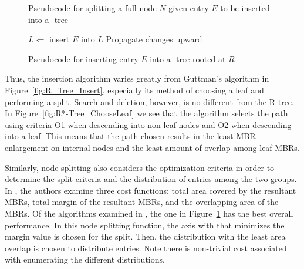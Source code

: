 \begin{figure}[ht!]
\begin{algorithmic}
		\EndFor
	\EndFunction
\end{algorithmic}
\caption{Pseudocode for splitting a full node $N$ given entry $E$ to be inserted into 
	a \rstar-tree}
\label{fig:R*-Tree_Split}
\end{figure}

\begin{figure}[ht!]
\begin{algorithmic}
		\State $L\Leftarrow$ 
			\State insert $E$ into $L$
		\Else
				\State {}
			\Else
				\State {}
			\EndIf
		\EndIf
		\State Propagate changes upward
	\EndFunction
\end{algorithmic}
\caption{Pseudocode for inserting entry $E$ into a \rstar-tree rooted at $R$}
\label{fig:R*-Tree_Insert}
\end{figure}

Thus, the insertion algorithm varies greatly from Guttman's algorithm in 
Figure~\ref{fig:R_Tree_Insert}, especially its method of choosing a leaf and performing a 
split. Search and deletion, however, is no different from the R-tree. In 
Figure~\ref{fig:R*-Tree_ChooseLeaf} we see that the algorithm selects the path using criteria
O1 when descending into non-leaf nodes and O2 when descending into a leaf. This means that
the path chosen results in the least MBR enlargement on internal nodes and the least 
amount of overlap among leaf MBRs. 

Similarly, node splitting also considers the optimization criteria in order to determine
the split criteria and the distribution of entries among the two groups. In 
\cite{beckmannkriegelschneiderseeger90}, the authors examine three cost functions: total area 
covered by the resultant MBRs, total margin of the resultant MBRs, and the overlapping area 
of the MBRs. Of the algorithms examined in \cite{beckmannkriegelschneiderseeger90}, the one in 
Figure~\ref{fig:R*-Tree_Split} has the best overall performance. In this node splitting 
function, the axis with that minimizes the margin value is chosen for the split. Then, the 
distribution with the least area overlap is chosen to distribute entries. Note there is 
non-trivial cost associated with enumerating the different distributions.

